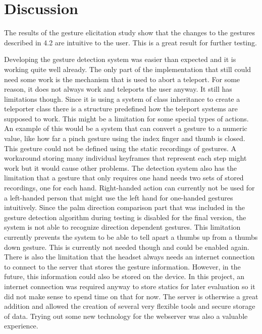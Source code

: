 \chapter{Discussion}

The results of the gesture elicitation study show that the changes to the gestures described in 4.2 are intuitive to the user. %
This is a great result for further testing.


Developing the gesture detection system was easier than expected and it is working quite well already. The only part of the implementation that still could need some work is the mechanism that is used to abort a teleport. For some reason, it does not always work and teleports the user anyway. It still has limitations though. Since it is using a system of class inheritance to create a teleporter class there is a structure predefined how the teleport systems are supposed to work. This might be a limitation for some special types of actions. An example of this would be a system that can convert a gesture to a numeric value, like how far a pinch gesture using the index finger and thumb is closed. This gesture could not be defined using the static recordings of gestures. A workaround storing many individual keyframes that represent each step might work but it would cause other problems. The detection system also has the limitation that a gesture that only requires one hand needs two sets of stored recordings, one for each hand. Right-handed action can currently not be used for a left-handed person that might use the left hand for one-handed gestures intuitively. Since the palm direction comparison part that was included in the gesture detection algorithm during testing is disabled for the final version, the system is not able to recognize direction dependent gestures. This limitation currently prevents the system to be able to tell apart a thumbs up from a thumbs down gesture. This is currently not needed though and could be enabled again.
There is also the limitation that the headset always needs an internet connection to connect to the server that stores the gesture information. However, in the future, this information could also be stored on the device. In this project, an internet connection was required anyway to store statics for later evaluation so it did not make sense to spend time on that for now. The server is otherwise a great addition and allowed the creation of several very flexible tools and secure storage of data. Trying out some new technology for the webserver was also a valuable experience. 
